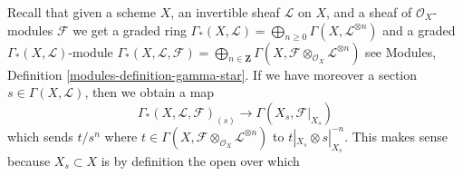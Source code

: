 \noindent
Recall that given a scheme $X$, an invertible sheaf $\mathcal{L}$
on $X$, and a sheaf of $\mathcal{O}_X$-modules $\mathcal{F}$
we get a graded ring
$\Gamma_*(X, \mathcal{L}) =
\bigoplus\nolimits_{n \geq 0} \Gamma(X, \mathcal{L}^{\otimes n})$
and a graded $\Gamma_*(X, \mathcal{L})$-module
$\Gamma_*(X, \mathcal{L}, \mathcal{F}) =
\bigoplus\nolimits_{n \in \mathbf{Z}}
\Gamma(X, \mathcal{F} \otimes_{\mathcal{O}_X} \mathcal{L}^{\otimes n})$
see Modules, Definition \ref{modules-definition-gamma-star}.
If we have moreover a section $s \in \Gamma(X, \mathcal{L})$, then
we obtain a map
\begin{equation}
\label{equation-module-invert-s}
\Gamma_*(X, \mathcal{L}, \mathcal{F})_{(s)}
\longrightarrow
\Gamma(X_s, \mathcal{F}|_{X_s})
\end{equation}
which sends $t/s^n$ where
$t \in \Gamma(X, \mathcal{F} \otimes_{\mathcal{O}_X} \mathcal{L}^{\otimes n})$
to $t|_{X_s} \otimes s|_{X_s}^{-n}$. This makes sense
because $X_s \subset X$ is by definition the open over which
